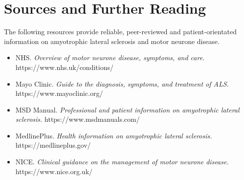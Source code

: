 \section*{Sources and Further Reading}
The following resources provide reliable, peer-reviewed and patient-orientated information on amyotrophic lateral sclerosis and motor neurone disease.

\begin{itemize}
    \item NHS. \textit{Overview of motor neurone disease, symptoms, and care.} https://www.nhs.uk/conditions/
    \item Mayo Clinic. \textit{Guide to the diagnosis, symptoms, and treatment of ALS.} https://www.mayoclinic.org/
    \item MSD Manual. \textit{Professional and patient information on amyotrophic lateral sclerosis.} https://www.msdmanuals.com/
    \item MedlinePlus. \textit{Health information on amyotrophic lateral sclerosis.} https://medlineplus.gov/
    \item NICE. \textit{Clinical guidance on the management of motor neurone disease.} https://www.nice.org.uk/
\end{itemize}
